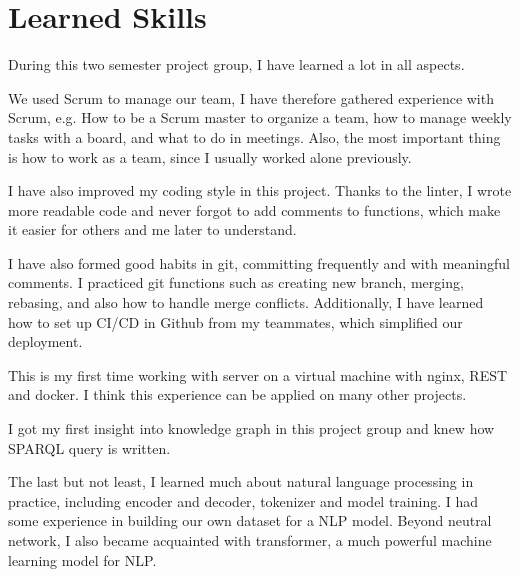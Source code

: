 
\section{Learned Skills}

During this two semester project group,
I have learned a lot in all aspects. 

We used Scrum to manage our team,
I have therefore gathered experience with Scrum, 
e.g. How to be a Scrum master to organize a team, 
how to manage weekly tasks with a board, 
and what to do in meetings. 
Also, the most important thing is how to work as a team, 
since I usually worked alone previously. 

I have also improved my coding style in this project. 
Thanks to the linter, 
I wrote more readable code and never forgot to add comments to functions, 
which make it easier for others and me later to understand.

I have also formed good habits in git, 
committing frequently and with meaningful comments. 
I practiced git functions such as creating new branch, merging, rebasing, 
and also how to handle merge conflicts.
Additionally, I have learned how to set up CI/CD in Github from my teammates, 
which simplified our deployment.

This is my first time working with server on a virtual machine
with nginx, REST and docker. 
I think this experience can be applied on many other projects. 

I got my first insight into knowledge graph in this project group
and knew how SPARQL query is written. 

The last but not least,
I learned much about natural language processing in practice, 
including encoder and decoder, tokenizer and model training. 
I had some experience in building our own dataset for a NLP model. 
Beyond neutral network, I also became acquainted with transformer,
a much powerful machine learning model for NLP. 